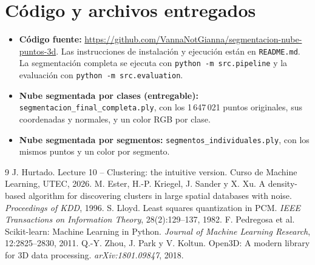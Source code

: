 \documentclass[11pt,a4paper]{article}
\newcommand{\repo}{https://github.com/VannaNotGianna/segmentacion-nube-puntos-3d}
\begin{document}
\section{Código y archivos entregados}
\begin{itemize}
  \item \textbf{Código fuente:} \url{\repo}. Las instrucciones de instalación y
        ejecución están en \texttt{README.md}. La segmentación completa se
        ejecuta con \texttt{python -m src.pipeline} y la evaluación con
        \texttt{python -m src.evaluation}.
  \item \textbf{Nube segmentada por clases (entregable):}
        \texttt{segmentacion\_final\_completa.ply}, con los 1\,647\,021 puntos
        originales, sus coordenadas y normales, y un color RGB por clase.
  \item \textbf{Nube segmentada por segmentos:}
        \texttt{segmentos\_individuales.ply}, con los mismos puntos y un color
        por segmento.
\end{itemize}

\begin{thebibliography}{9}
 J. Hurtado. Lecture 10 -- Clustering: the intuitive version.
  Curso de Machine Learning, UTEC, 2026.
 M. Ester, H.-P. Kriegel, J. Sander y X. Xu. A density-based
  algorithm for discovering clusters in large spatial databases with noise.
  \emph{Proceedings of KDD}, 1996.
 S. Lloyd. Least squares quantization in PCM.
  \emph{IEEE Transactions on Information Theory}, 28(2):129--137, 1982.
 F. Pedregosa et al. Scikit-learn: Machine Learning in Python.
  \emph{Journal of Machine Learning Research}, 12:2825--2830, 2011.
 Q.-Y. Zhou, J. Park y V. Koltun. Open3D: A modern library for
  3D data processing. \emph{arXiv:1801.09847}, 2018.
\end{thebibliography}
\end{document}
